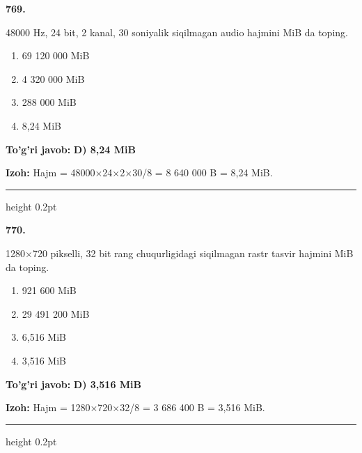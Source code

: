 \documentclass[10pt,a4paper,oneside]{article}
\begin{document}
\noindent\textbf{\color{ink}769.}
\par
48000 Hz, 24 bit, 2 kanal, 30 soniyalik siqilmagan audio hajmini MiB da toping.
\begin{enumerate}[label=\Alph*),leftmargin=9mm]
\item 69 120 000 MiB
\item 4 320 000 MiB
\item 288 000 MiB
\item 8,24 MiB
\end{enumerate}
\begin{tcolorbox}[enhanced,breakable,colback=teal!4,colframe=teal!50!black,boxrule=0.5pt,arc=1.1mm,left=3mm,right=3mm,top=1.7mm,bottom=1.7mm,before skip=2mm,after skip=2mm]
\textbf{\color{teal}To'g'ri javob:} \textbf{D) 8,24 MiB}
\par\smallskip
\textbf{Izoh:} Hajm = 48000\ensuremath{\times}24\ensuremath{\times}2\ensuremath{\times}30/8 = 8 640 000 B = 8,24 MiB.
\end{tcolorbox}
\vspace{2mm}\hrule height 0.2pt \vspace{3mm}

\noindent\textbf{\color{ink}770.}
\par
1280\ensuremath{\times}720 pikselli, 32 bit rang chuqurligidagi siqilmagan rastr tasvir hajmini MiB da toping.
\begin{enumerate}[label=\Alph*),leftmargin=9mm]
\item 921 600 MiB
\item 29 491 200 MiB
\item 6,516 MiB
\item 3,516 MiB
\end{enumerate}
\begin{tcolorbox}[enhanced,breakable,colback=teal!4,colframe=teal!50!black,boxrule=0.5pt,arc=1.1mm,left=3mm,right=3mm,top=1.7mm,bottom=1.7mm,before skip=2mm,after skip=2mm]
\textbf{\color{teal}To'g'ri javob:} \textbf{D) 3,516 MiB}
\par\smallskip
\textbf{Izoh:} Hajm = 1280\ensuremath{\times}720\ensuremath{\times}32/8 = 3 686 400 B = 3,516 MiB.
\end{tcolorbox}
\vspace{2mm}\hrule height 0.2pt \vspace{3mm}
\end{document}
